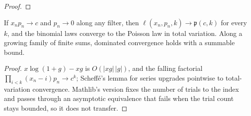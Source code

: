 \begin{proof}
    \leanok
\end{proof}

\begin{lemma}
    \label{lem:sc-poisson-limit}
    \leanok

    If $x_n p_n \to c$ and $p_n \to 0$ along any filter, then $\ell(x_n, p_n, k) \to \mathfrak p(c,k)$
    for every $k$, and the binomial laws converge to the Poisson law in total variation. Along a
    growing family of finite sums, dominated convergence holds with a summable bound.
\end{lemma}
\begin{proof}
    \leanok
    $x\log(1+g) - xg$ is $O(|xg|\,|g|)$, and the falling factorial $\prod_{i<k}(x_n - i)p_n \to c^k$;
    Scheff\'e's lemma for series upgrades pointwise to total-variation convergence. Mathlib's
    version fixes the number of trials to the index and passes through an asymptotic equivalence
    that fails when the trial count stays bounded, so it does not transfer.
\end{proof}

